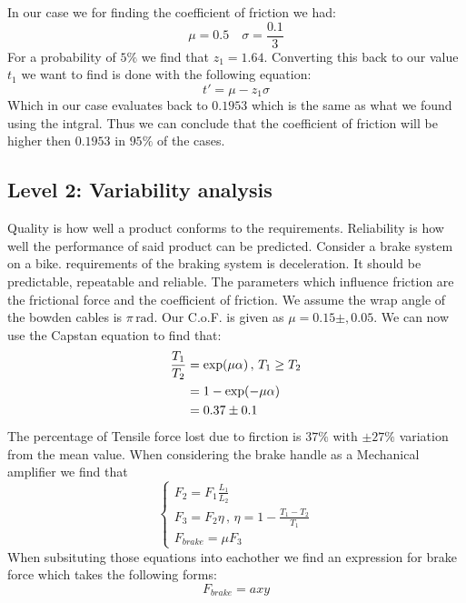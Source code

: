 \documentclass[11pt, a4paper]{article}
\newcommand*{\rad}{\ensuremath{\,\text{rad}}}
\numberwithin{equation}{section}
\numberwithin{figure}{section}
\begin{document}
In our case we for finding the coefficient of friction we had:
\begin{equation*}
  \mu = 0.5 \quad \sigma = \frac{0.1}{3}
\end{equation*}
For a probability of $5\%$ we find that $z_1 = 1.64$. Converting this back to our value $t_1$ we want to find is done with the following equation:
\begin{equation}
  t' = \mu - z_1\sigma
\end{equation}
Which in our case evaluates back to $0.1953$ which is the same as what we found using the intgral. Thus we can conclude that the coefficient of friction will be higher then $0.1953$ in $95\%$ of the cases.


\subsection{Level 2: Variability analysis}
Quality is how well a product conforms to the requirements. Reliability is how well the performance of said product can be predicted.
Consider a brake system on a bike. requirements of the braking system is deceleration. It should be predictable, repeatable and reliable. The parameters which influence friction are the frictional force and the coefficient of friction. We assume the wrap angle of the bowden cables is $\pi \rad$. Our C.o.F. is given as $\mu = 0.15\pm,0.05$. We can now use the Capstan equation to find that:
\begin{align}
  \frac{T_1}{T_2} &= \exp(\mu \alpha)\,,\,T_1\geq T_2\\
                  &= 1 - \exp(-\mu\alpha)\notag\\
                  &= 0.37\pm0.1\notag
\end{align}
The percentage of Tensile force lost due to firction is $37\%$ with $\pm27\%$ variation from the mean value. When considering the brake handle as a Mechanical amplifier we find that
\begin{equation}
  \begin{cases}
    F_2 = F_1\frac{L_1}{L_2}\\
    F_3 = F_2\eta\,,\,\eta = 1 - \frac{T_1 - T_2}{T_1}\\
    F_{brake} = \mu F_3
  \end{cases}
\end{equation}
When subsituting those equations into eachother we find an expression for brake force which takes the following forms:
\begin{equation}
  F_{brake} = axy
\end{equation}
\end{document}
